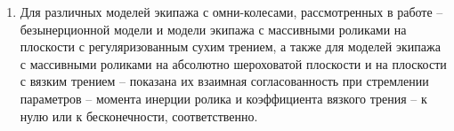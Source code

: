 \begin{enumerate}

        \item {
            Для различных моделей экипажа с омни-колесами, рассмотренных в работе -- безынерционной модели и модели экипажа с массивными роликами на плоскости с регуляризованным сухим трением, а также для моделей экипажа с массивными роликами на абсолютно шероховатой плоскости и на плоскости с вязким трением -- показана их взаимная согласованность
            при стремлении параметров -- момента инерции ролика и коэффициента вязкого трения -- к нулю или к бесконечности, соответственно.
        }
        






\end{enumerate}